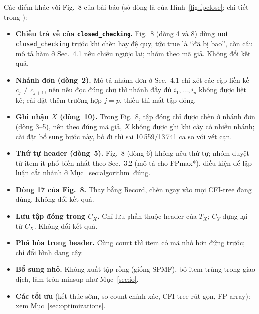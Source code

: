 Các điểm khác với Fig.~8 của bài báo (số dòng là của Hình~\ref{fig:fpclose}; chi tiết trong ):
\begin{itemize}
  \item \textbf{Chiều trả về của \texttt{closed\_checking}.} Fig.~8 (dòng 4 và 8) dùng \textbf{not}
  \texttt{closed\_checking} trước khi chèn hay đệ quy, tức true là ``đã bị bao'', còn câu mô tả hàm ở Sec.~4.1 nêu chiều
  ngược lại; nhóm theo mã giả. Không đổi kết quả.
  \item \textbf{Nhánh đơn (dòng~2).} Mô tả nhánh đơn ở Sec.~4.1 chỉ xét các cặp liền kề $c_j \neq c_{j+1}$, nên nếu đọc
  đúng chữ thì nhánh đầy đủ $i_1, \ldots, i_p$ không được liệt kê; cài đặt thêm trường hợp $j = p$, thiếu thì mất tập đóng.
  \item \textbf{Ghi nhận $X$ (dòng~10).} Trong Fig.~8, tập đóng chỉ được chèn ở nhánh đơn (dòng 3--5), nên theo đúng mã
  giả, $X$ không được ghi khi cây có nhiều nhánh; cài đặt bổ sung bước này, bỏ đi thì sai 10\,559/13\,741 ca so với vét cạn.
  \item \textbf{Thứ tự header (dòng~5).} Fig.~8 (dòng 6) không nêu thứ tự; nhóm duyệt từ item ít phổ biến nhất theo
  Sec.~3.2 (mô tả cho FPmax*), điều kiện để lập luận cắt nhánh ở Mục~\ref{sec:algorithm} đúng.
  \item \textbf{Dòng 17 của Fig.~8.} Thay bằng Record, chèn ngay vào mọi CFI-tree đang dùng. Không đổi kết quả.
  \item \textbf{Lưu tập đóng trong $C_X$.} Chỉ lưu phần thuộc header của $T_X$; $C_Y$ dựng lại từ $C_X$. Không đổi kết
  quả.
  \item \textbf{Phá hòa trong header.} Cùng count thì item có mã nhỏ hơn đứng trước; chỉ đổi hình dạng cây.
  \item \textbf{Bổ sung nhỏ.} Không xuất tập rỗng (giống SPMF), bỏ item trùng trong giao dịch, làm tròn minsup như
  Mục~\ref{sec:io}.
  \item \textbf{Các tối ưu} (kết thúc sớm, so count chính xác, CFI-tree rút gọn, FP-array): xem
  Mục~\ref{sec:optimizations}.
\end{itemize}
